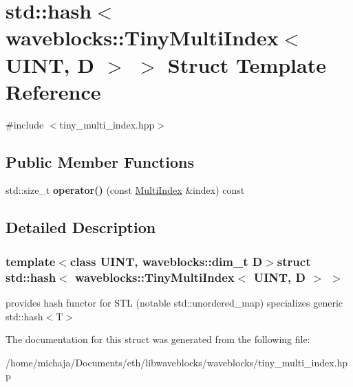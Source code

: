 \hypertarget{structstd_1_1hash_3_01waveblocks_1_1_tiny_multi_index_3_01_u_i_n_t_00_01_d_01_4_01_4}{}\section{std\+:\+:hash$<$ waveblocks\+:\+:Tiny\+Multi\+Index$<$ U\+I\+N\+T, D $>$ $>$ Struct Template Reference}
\label{structstd_1_1hash_3_01waveblocks_1_1_tiny_multi_index_3_01_u_i_n_t_00_01_d_01_4_01_4}


{\ttfamily \#include $<$tiny\+\_\+multi\+\_\+index.\+hpp$>$}

\subsection*{Public Member Functions}
\begin{DoxyCompactItemize}
\item 
\hypertarget{structstd_1_1hash_3_01waveblocks_1_1_tiny_multi_index_3_01_u_i_n_t_00_01_d_01_4_01_4_a2e8ca36517b4b3993266a791c432008e}{}std\+::size\+\_\+t {\bfseries operator()} (const \hyperlink{classwaveblocks_1_1_tiny_multi_index}{Multi\+Index} \&index) const \label{structstd_1_1hash_3_01waveblocks_1_1_tiny_multi_index_3_01_u_i_n_t_00_01_d_01_4_01_4_a2e8ca36517b4b3993266a791c432008e}

\end{DoxyCompactItemize}


\subsection{Detailed Description}
\subsubsection*{template$<$class U\+I\+N\+T, waveblocks\+::dim\+\_\+t D$>$struct std\+::hash$<$ waveblocks\+::\+Tiny\+Multi\+Index$<$ U\+I\+N\+T, D $>$ $>$}

provides hash functor for S\+T\+L (notable std\+::unordered\+\_\+map) specializes generic std\+::hash$<$\+T$>$ 

The documentation for this struct was generated from the following file\+:\begin{DoxyCompactItemize}
\item 
/home/michaja/\+Documents/eth/libwaveblocks/waveblocks/tiny\+\_\+multi\+\_\+index.\+hpp\end{DoxyCompactItemize}
